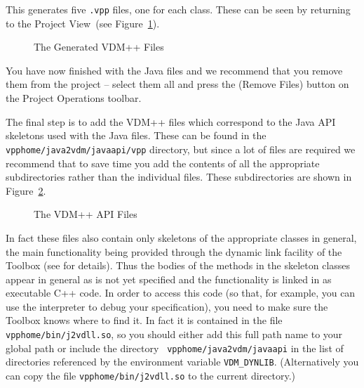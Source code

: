 \documentclass[\pformat,12pt]{article}
\newcommand{\vdmhome}{vpphome}
\newcommand{\guicmd}[1]{{\sf #1}}
\begin{document}
This generates five {\tt .vpp} files, one for each class. These can be
seen by returning to the \guicmd{Project View}~(see
Figure~\ref{fig:vdmFiles}). 

\begin{figure}[tbh]
\begin{center}
\caption{The Generated VDM++ Files}\label{fig:vdmFiles}
\end{center}
\end{figure}

You have now finished with the Java files and we recommend that you
remove them from the project -- select them all and press the 
(\guicmd{Remove Files}) button on the \guicmd{Project Operations}
toolbar.

The final step is to add the VDM++ files which correspond to the Java
API skeletons used with the Java files. These can be found in the {\tt
  \vdmhome/java2vdm/javaapi/vpp} directory, but since a lot of files are
required we recommend that to save time you add the contents of all
the appropriate subdirectories rather than the individual files. These
subdirectories are shown in Figure~\ref{fig:vdmApiFiles}. 

\begin{figure}[tbh]
\begin{center}
\caption{The VDM++ API Files}\label{fig:vdmApiFiles}
\end{center}
\end{figure}

In fact these files also contain only skeletons of the appropriate
classes in general, the main functionality being provided through the
dynamic link facility of the Toolbox (see \cite{DLMan-CSK} for
details). Thus the bodies of the methods in the skeleton classes
appear in general as \textsf{is not yet specified} and the
functionality is linked in as executable C++ code. In order to access
this code (so that, for example, you can use the interpreter to debug
your specification), you need to make sure the Toolbox knows where to
find it. In fact it is contained in the file {\tt
  \vdmhome/bin/j2vdll.so}, so you should either add this full 
path name to your global path or include the directory {\tt
  \vdmhome/java2vdm/javaapi} in the list of directories referenced by the
environment variable {\tt VDM\_DYNLIB}. (Alternatively you can copy
the file {\tt \vdmhome/bin/j2vdll.so} to the current directory.)
\end{document}
